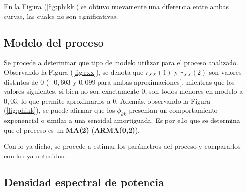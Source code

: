 En la Figura (\ref{fig:phikk}) se obtuvo nuevamente una diferencia entre ambas curvas, las cuales no son significativas.

\subsection{Modelo del proceso}

Se procede a determinar que tipo de modelo utilizar para el proceso analizado. Observando la Figura (\ref{fig:rxx}), se denota que $r_{XX}(1)$ y $r_{XX}(2)$ son valores distintos de 0 ($-0,603$ y $0,099$ para ambas aproximaciones), mientras que los valores siguientes, si bien no son exactamente 0, son todos menores en modulo a $0,03$, lo que permite aproximarlos a 0. Además, observando la Figura (\ref{fig:phikk}), se puede afirmar que los $\phi_{kk}$ presentan un comportamiento exponencial o similar a una senoidal amortiguada. Es por ello que se determina que el proceso es un \textbf{MA(2)} (\textbf{ARMA(0,2)}).

Con lo ya dicho, se procede a estimar los parámetros del proceso y compararlos con los ya obtenidos.





\subsection{Densidad espectral de potencia}


